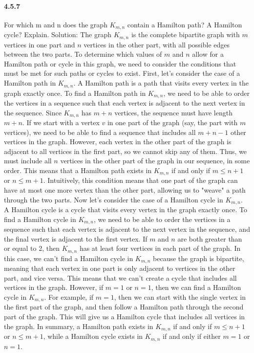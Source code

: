 \documentclass{article}
\begin{document}
\paragraph{4.5.7}
For which m and n does the graph $K_{m,n}$ contain a Hamilton path? A Hamilton cycle? Explain.\newline
Solution:\newline
The graph $K_{m,n}$ is the complete bipartite graph with $m$ vertices in one part and $n$ vertices in the other part, with all possible edges between the two parts. To determine which values of $m$ and $n$ allow for a Hamilton path or cycle in this graph, we need to consider the conditions that must be met for such paths or cycles to exist.\newline
First, let's consider the case of a Hamilton path in $K_{m,n}$. A Hamilton path is a path that visits every vertex in the graph exactly once. To find a Hamilton path in $K_{m,n}$, we need to be able to order the vertices in a sequence such that each vertex is adjacent to the next vertex in the sequence. Since $K_{m,n}$ has $m+n$ vertices, the sequence must have length $m+n$.\newline
If we start with a vertex $v$ in one part of the graph (say, the part with $m$ vertices), we need to be able to find a sequence that includes all $m+n-1$ other vertices in the graph. However, each vertex in the other part of the graph is adjacent to all vertices in the first part, so we cannot skip any of them. Thus, we must include all $n$ vertices in the other part of the graph in our sequence, in some order.\newline
This means that a Hamilton path exists in $K_{m,n}$ if and only if $m \leq n+1$ or $n \leq m+1$. Intuitively, this condition means that one part of the graph can have at most one more vertex than the other part, allowing us to "weave" a path through the two parts.\newline
Now let's consider the case of a Hamilton cycle in $K_{m,n}$. A Hamilton cycle is a cycle that visits every vertex in the graph exactly once. To find a Hamilton cycle in $K_{m,n}$, we need to be able to order the vertices in a sequence such that each vertex is adjacent to the next vertex in the sequence, and the final vertex is adjacent to the first vertex.\newline
If $m$ and $n$ are both greater than or equal to 2, then $K_{m,n}$ has at least four vertices in each part of the graph. In this case, we can't find a Hamilton cycle in $K_{m,n}$ because the graph is bipartite, meaning that each vertex in one part is only adjacent to vertices in the other part, and vice versa. This means that we can't create a cycle that includes all vertices in the graph.\newline
However, if $m=1$ or $n=1$, then we can find a Hamilton cycle in $K_{m,n}$. For example, if $m=1$, then we can start with the single vertex in the first part of the graph, and then follow a Hamilton path through the second part of the graph. This will give us a Hamilton cycle that includes all vertices in the graph.\newline
In summary, a Hamilton path exists in $K_{m,n}$ if and only if $m \leq n+1$ or $n \leq m+1$, while a Hamilton cycle exists in $K_{m,n}$ if and only if either $m=1$ or $n=1$.
\end{document}
